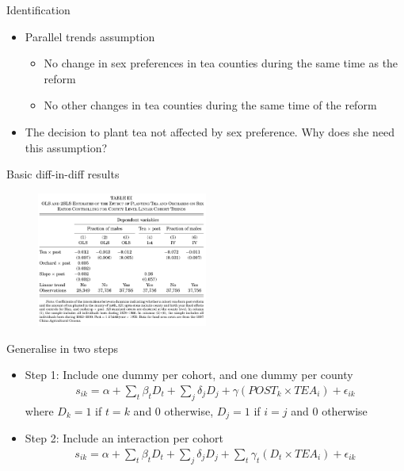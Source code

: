 \documentclass[11pt,notes=hide,aspectratio=169,mathserif]{beamer}
\begin{document}
\begin{frame}{Identification}
\begin{itemize}
\item Parallel trends assumption
\begin{itemize}
    \pause \item No change in sex preferences in tea counties during the same time as the reform
    \pause \item No other changes in tea counties during the same time of the reform
\end{itemize}
\pause \item The decision to plant tea not affected by sex preference. Why
does she need this assumption?
\end{itemize}
\end{frame}

\begin{frame}{Basic diff-in-diff results}
\begin{figure}
\centering
\includegraphics[width=0.5\textwidth]{inputs/table3.png}
\end{figure}
\end{frame}

\begin{frame}{Generalise in two steps}
\begin{itemize}
\item Step 1: Include one dummy per cohort, and one dummy per county
\begin{align*}
s_{ik} = \alpha + \sum_t \beta_t D_t + \sum_j \delta_j D_j + \gamma (POST_k \times TEA_i) + \epsilon_{ik}
\end{align*}
where $D_k = 1$ if $t = k$ and $0$ otherwise, $D_j =1$ if $i = j$ and $0$ otherwise
\item Step 2:  Include an interaction per cohort
\begin{align*}
s_{ik} = \alpha + \sum_t \beta_t D_t + \sum_j \delta_j D_j + \sum_t \gamma_t (D_t \times TEA_i) + \epsilon_{ik}
\end{align*}
\end{itemize}
\end{frame}
\end{document}
